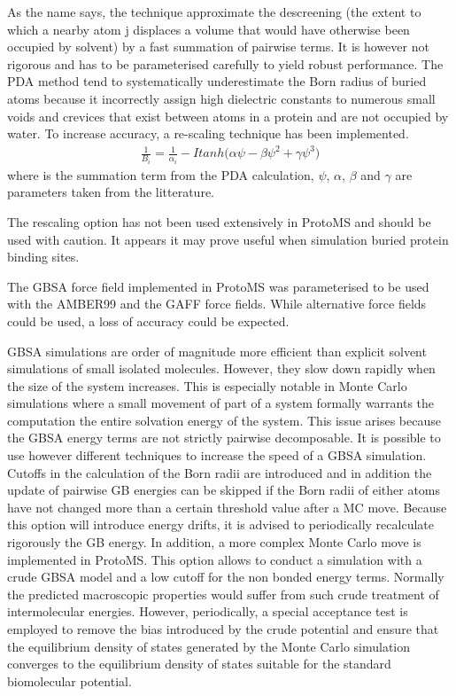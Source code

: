 \documentclass[letterpaper,10pt,english]{sphinxmanual}
\begin{document}
As the name says, the technique approximate the descreening (the extent to which a nearby atom j displaces a volume that would have otherwise been occupied by solvent) by a fast summation of pairwise terms. It is however not rigorous and has to be parameterised carefully to yield robust performance. The PDA method tend to systematically underestimate the Born radius of buried atoms because it incorrectly assign high dielectric constants to numerous small voids and crevices that exist between atoms in a protein and are not occupied by water. To increase accuracy, a re-scaling technique has been implemented.
\begin{equation*}
\begin{split}{\frac{1}{B_i}}  = \frac{1}{\alpha _{i}} - Itanh\big( \alpha \psi - \beta \psi^{2} + \gamma \psi^{3}  \big)\end{split}
\end{equation*}
where  is the summation term from the PDA calculation, \(\psi\), \(\alpha\), \(\beta\) and \(\gamma\) are parameters taken from the litterature.

The rescaling option has not been used extensively in ProtoMS and should be used with caution. It appears it may prove useful when simulation buried protein binding sites.

The GBSA force field implemented in ProtoMS was parameterised to be used with the AMBER99 and the GAFF force fields. While alternative force fields could be used, a loss of accuracy could be expected.

GBSA simulations are order of magnitude more efficient than explicit solvent simulations of small isolated molecules. However, they slow
down rapidly when the size of the system increases. This is especially notable in Monte Carlo simulations where a small movement of part of a system formally warrants the computation the entire solvation energy of the system. This issue arises because the GBSA energy terms are not strictly pairwise decomposable.  It is possible to use however different techniques to increase the speed of a GBSA simulation. Cutoffs in the calculation of the Born radii are introduced and in addition the update of pairwise GB energies can be skipped if the Born radii of either atoms have not changed more than a certain threshold value after a MC move. Because this option will introduce energy drifts, it is advised to periodically recalculate rigorously the GB energy. In addition, a more complex Monte Carlo move is implemented in ProtoMS. This option allows to conduct a simulation with a crude GBSA model and a low cutoff for the non bonded energy terms. Normally the  predicted macroscopic properties would suffer from such crude treatment of intermolecular energies. However, periodically, a special acceptance test is employed to remove the bias introduced by the crude potential and ensure that the equilibrium density of states generated by the Monte Carlo simulation converges to the equilibrium density of states suitable for the standard biomolecular potential.
\end{document}
